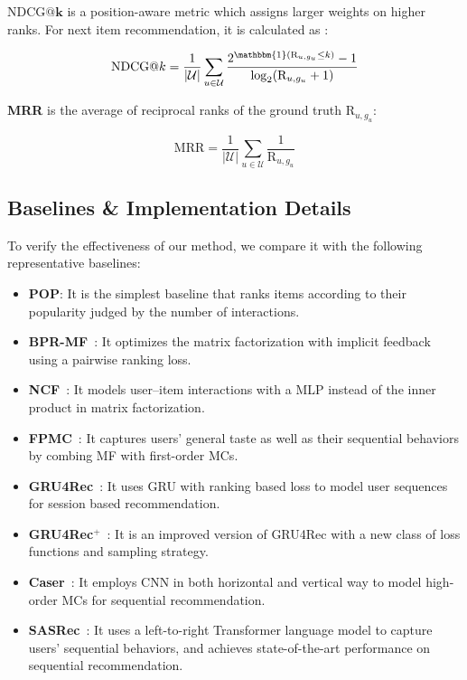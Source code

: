$\bm{\mathrm{NDCG}@k}$ is a position-aware metric which assigns larger weights on higher ranks. For next item recommendation, it is calculated as :

\begin{equation*}
    \mathrm{NDCG}@k = \frac{1}{\vert \mathcal{U} \vert}\sum_{u \in \mathcal{U}} \frac{2^{\mathbbm{1}(\mathrm{R}_{u, g_u} \leq k)} - 1}{\log_2 (\mathrm{R}_{u, g_u} + 1)}
\end{equation*}

\textbf{MRR} is the average of reciprocal ranks of the ground truth $\mathrm{R}_{u, g_u}$:

\begin{equation*}
    \mathrm{MRR} = \frac{1}{\vert \mathcal{U} \vert}\sum_{u \in \mathcal{U}}\frac{1}{\mathrm{R}_{u, g_u}}
\end{equation*}

\fi

\subsection{Baselines \& Implementation Details}

To verify the effectiveness of our method, we compare it with the following representative baselines:

\begin{itemize}[leftmargin=0.6cm]
    \item \textbf{POP}: It is the simplest baseline that ranks items according to their popularity judged by the number of interactions.
    \item \textbf{BPR-MF}~\cite{Rendle:UAI2009:BBP}: It optimizes the matrix factorization with implicit feedback using a pairwise ranking loss.
    \item \textbf{NCF}~\cite{He:www2017:NCF}: It models user–item interactions with a MLP instead of the inner product in matrix factorization.
    \item \textbf{FPMC}~\cite{Rendle:WWW2010:FPM}: It captures users' general taste as well as their sequential behaviors by combing MF with first-order MCs.
    \item \textbf{GRU4Rec}~\cite{Hidasi:ICLR2016:gru4rec}: It uses GRU with ranking based loss to model user sequences for session based recommendation.
    \item \textbf{GRU4Rec$^{+}$}~\cite{Hidasi:CIKM2018:RNN}: It is an improved version of GRU4Rec with a new class of loss functions and sampling strategy.
    \item \textbf{Caser}~\cite{Tang:WSDM2018:caser}: It employs CNN in both horizontal and vertical way to model high-order MCs for sequential recommendation.
    \item \textbf{SASRec}~\cite{Kang:ICDM2018:SAS}: It uses a left-to-right Transformer language model to capture users' sequential behaviors, and achieves state-of-the-art performance on sequential recommendation.
\end{itemize}

